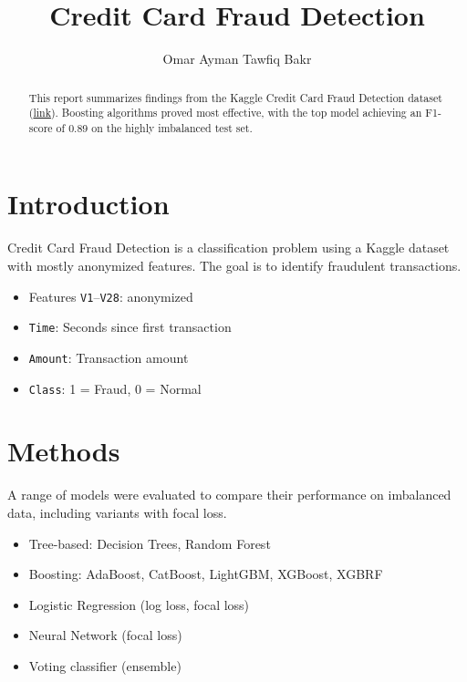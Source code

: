 \documentclass[10pt,a4paper,twocolumn,twoside]{tau-class/tau}
\title{Credit Card Fraud Detection}
\author[1]{Omar Ayman Tawfiq Bakr \href{mailto:bakro0298@gmail.com}{\faGoogle}\hspace{0.5em}
 \href{https://www.linkedin.com/in/omarrbakr/}{\faLinkedinIn}\hspace{0.5em} \href{https://github.com/omarTBakr}{\faGithub}}
\begin{document}
        
    \maketitle
    \thispagestyle{firststyle}
    
    \begin{abstract}    
        This report summarizes findings from the Kaggle Credit Card Fraud Detection dataset (\href{https://www.kaggle.com/datasets/mlg-ulb/creditcardfraud}{link}). Boosting algorithms proved most effective, with the top model achieving an F1-score of 0.89 on the highly imbalanced test set.
    \end{abstract}


\section{Introduction}
Credit Card Fraud Detection is a classification problem using a Kaggle dataset with mostly anonymized features. The goal is to identify fraudulent transactions.
\begin{itemize}[noitemsep] %
    \item Features \texttt{V1}--\texttt{V28}: anonymized
    \item \texttt{Time}: Seconds since first transaction
    \item \texttt{Amount}: Transaction amount
    \item \texttt{Class}: 1 = Fraud, 0 = Normal
\end{itemize}

\section{Methods}
A range of models were evaluated to compare their performance on imbalanced data, including variants with focal loss.
\begin{itemize}[noitemsep]
    \item Tree-based: Decision Trees, Random Forest
    \item Boosting: AdaBoost, CatBoost, LightGBM, XGBoost, XGBRF
    \item Logistic Regression (log loss, focal loss)
    \item Neural Network (focal loss)
    \item Voting classifier (ensemble)
\end{itemize}
\end{document}
